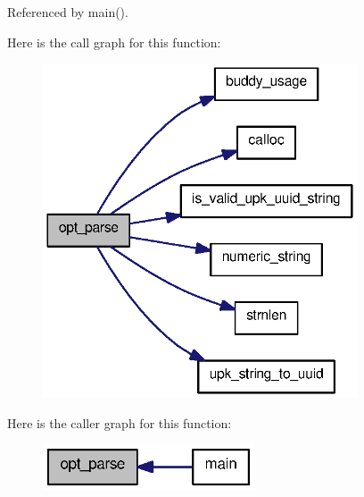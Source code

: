 Referenced by main().



Here is the call graph for this function:
\nopagebreak
\begin{figure}[H]
\begin{center}
\leavevmode
\includegraphics[width=264pt]{buddy__main_8c_adbe704e27f14c47d6f5fbe8689e140d0_cgraph}
\end{center}
\end{figure}




Here is the caller graph for this function:\nopagebreak
\begin{figure}[H]
\begin{center}
\leavevmode
\includegraphics[width=178pt]{buddy__main_8c_adbe704e27f14c47d6f5fbe8689e140d0_icgraph}
\end{center}
\end{figure}


